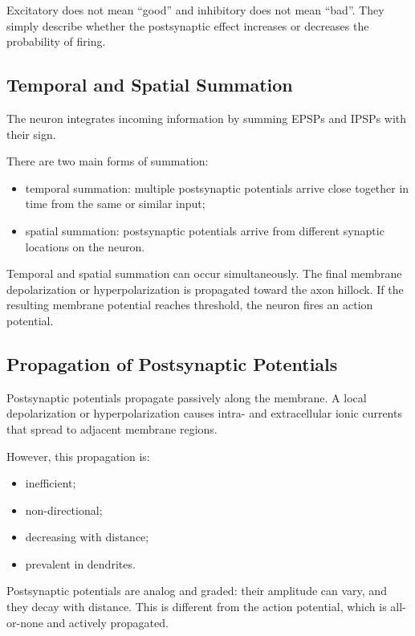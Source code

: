 \begin{authornote}
Excitatory does not mean ``good'' and inhibitory does not mean ``bad''. They simply describe whether the postsynaptic effect increases or decreases the probability of firing.
\end{authornote}

\subsection{Temporal and Spatial Summation}

The neuron integrates incoming information by summing EPSPs and IPSPs with their sign.

There are two main forms of summation:

\begin{itemize}[noitemsep]
    \item temporal summation: multiple postsynaptic potentials arrive close together in time from the same or similar input;
    \item spatial summation: postsynaptic potentials arrive from different synaptic locations on the neuron.
\end{itemize}

Temporal and spatial summation can occur simultaneously. The final membrane depolarization or hyperpolarization is propagated toward the axon hillock. If the resulting membrane potential reaches threshold, the neuron fires an action potential.

\subsection{Propagation of Postsynaptic Potentials}

Postsynaptic potentials propagate passively along the membrane. A local depolarization or hyperpolarization causes intra- and extracellular ionic currents that spread to adjacent membrane regions.

However, this propagation is:

\begin{itemize}[noitemsep]
    \item inefficient;
    \item non-directional;
    \item decreasing with distance;
    \item prevalent in dendrites.
\end{itemize}

\begin{authornote}
Postsynaptic potentials are analog and graded: their amplitude can vary, and they decay with distance. This is different from the action potential, which is all-or-none and actively propagated.
\end{authornote}

